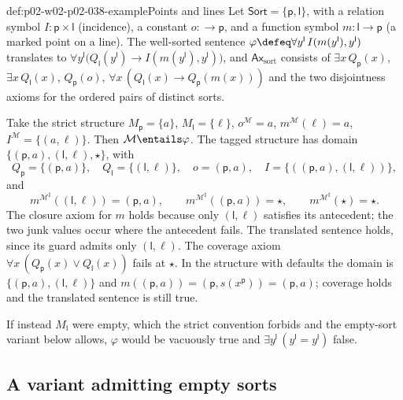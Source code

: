 \begin{hbexample}{def:p02-w02-p02-038-example}{Points and lines}
Let \(\mathsf{Sort}=\{\mathsf p,\mathsf l\}\), with a relation symbol
\(I:\mathsf p\times\mathsf l\) (incidence), a constant \(o:\longrightarrow
\mathsf p\), and a function symbol \(m:\mathsf l\longrightarrow\mathsf p\)
(a marked point on a line).  The well-sorted sentence
\(\varphi\defeq\forall y^{\mathsf l}\,I(m(y^{\mathsf l}),y^{\mathsf l})\)
translates to
\(\forall y^{\mathsf l}\bigl(Q_{\mathsf l}(y^{\mathsf l})\to
I(m(y^{\mathsf l}),y^{\mathsf l})\bigr)\), and
\(\mathsf{Ax}_{\mathrm{sort}}\) consists of \(\exists x\,Q_{\mathsf p}(x)\),
\(\exists x\,Q_{\mathsf l}(x)\), \(Q_{\mathsf p}(o)\),
\(\forall x\,(Q_{\mathsf l}(x)\to Q_{\mathsf p}(m(x)))\) and the two
disjointness axioms for the ordered pairs of distinct sorts.

Take the strict structure \(M_{\mathsf p}=\{a\}\),
\(M_{\mathsf l}=\{\ell\}\), \(o^{\mathcal M}=a\), \(m^{\mathcal M}(\ell)=a\),
\(I^{\mathcal M}=\{(a,\ell)\}\).  Then \(\mathcal M\entails\varphi\).  The
tagged structure has domain
\(\{(\mathsf p,a),(\mathsf l,\ell),\star\}\), with
\[
 Q_{\mathsf p}=\{(\mathsf p,a)\},\quad Q_{\mathsf l}=\{(\mathsf l,\ell)\},\quad
 o=(\mathsf p,a),\quad
 I=\{((\mathsf p,a),(\mathsf l,\ell))\},
\]
and
\[
 m^{\mathcal M^{\sharp}}((\mathsf l,\ell))=(\mathsf p,a),\qquad
 m^{\mathcal M^{\sharp}}((\mathsf p,a))=\star,\qquad
 m^{\mathcal M^{\sharp}}(\star)=\star.
\]
The closure axiom for \(m\) holds because only \((\mathsf l,\ell)\)
satisfies its antecedent; the two junk values occur where the antecedent
fails.  The translated sentence holds, since its guard admits only
\((\mathsf l,\ell)\).  The coverage axiom
\(\forall x\,(Q_{\mathsf p}(x)\lor Q_{\mathsf l}(x))\) fails at \(\star\).
In the structure with defaults the domain is
\(\{(\mathsf p,a),(\mathsf l,\ell)\}\) and
\(m((\mathsf p,a))=(\mathsf p,s(x^{\mathsf p}))=(\mathsf p,a)\); coverage
holds and the translated sentence is still true.

If instead \(M_{\mathsf l}\) were empty, which the strict convention forbids
and the empty-sort variant below allows, \(\varphi\) would be vacuously true
and \(\exists y^{\mathsf l}\,(y^{\mathsf l}=y^{\mathsf l})\) false.
\end{hbexample}

\subsection{A variant admitting empty sorts}
\label{sec:p02-w02-p02-038-empty}

